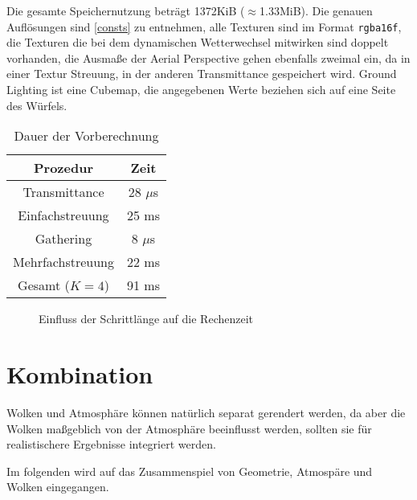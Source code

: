 Die gesamte Speichernutzung beträgt 1372KiB ($\approx$1.33MiB). Die genauen Auflösungen sind \cref{consts} zu
entnehmen, alle Texturen sind im Format \texttt{rgba16f}, die Texturen die bei dem dynamischen Wetterwechsel mitwirken
sind doppelt vorhanden, die Ausmaße der Aerial Perspective gehen ebenfalls zweimal ein, da in einer Textur Streuung, in
der anderen Transmittance gespeichert wird. Ground Lighting ist eine Cubemap, die angegebenen Werte beziehen sich auf
eine Seite des Würfels.

\begin{table}
\centering
	\begin{tabular}{| c | c |}
	\hline
	Prozedur & Zeit\\ \hline
	Transmittance & 28 $\mu$s\\
	Einfachstreuung & 25 ms\\
	Gathering & 8 $\mu$s\\
	Mehrfachstreuung & 22 ms \\ \hline
	Gesamt ($K=4$) & 91 ms \\ \hline
	\end{tabular}
\caption{Dauer der Vorberechnung}
\label{precomp_sloooow}
\end{table}

\begin{figure}
\centering
{}

\caption{Einfluss der Schrittlänge auf die Rechenzeit}
\label{steps}
\end{figure}

\clearpage
\part{Kombination}
Wolken und Atmosphäre können natürlich separat gerendert werden, da aber die Wolken maßgeblich von der Atmosphäre
beeinflusst werden, sollten sie für realistischere Ergebnisse integriert werden.

Im folgenden wird auf das Zusammenspiel von Geometrie, Atmospäre und Wolken eingegangen.
